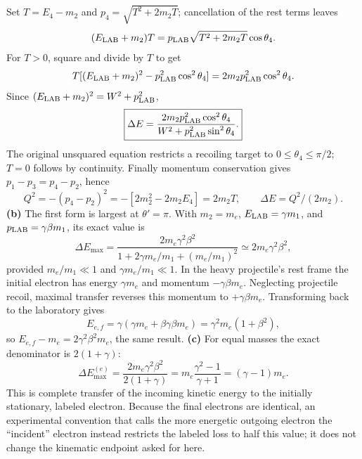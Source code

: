 Set $T=E_4-m_2$ and $p_4=\sqrt{T^2+2m_2T}$; cancellation
of the rest terms leaves
\[
(E_{\rm LAB}+m_2)T=p_{\rm LAB}\sqrt{T^2+2m_2T}\cos\theta_4.
\]
For $T>0$, square and divide by $T$ to get
\[
T[(E_{\rm LAB}+m_2)^2-p_{\rm LAB}^2\cos^2\theta_4]
=2m_2p_{\rm LAB}^2\cos^2\theta_4.
\]
Since $(E_{\rm LAB}+m_2)^2=W^2+p_{\rm LAB}^2$,
\[
\boxed{\Delta E=\frac{2m_2p_{\rm LAB}^2\cos^2\theta_4}
{W^2+p_{\rm LAB}^2\sin^2\theta_4}.}
\]
The original unsquared equation restricts a recoiling target to
$0\leq\theta_4\leq\pi/2$; $T=0$ follows by continuity.
Finally momentum conservation gives $p_1-p_3=p_4-p_2$, hence
\[
Q^2=-(p_4-p_2)^2=-[2m_2^2-2m_2E_4]=2m_2T,
\qquad\boxed{\Delta E=Q^2/(2m_2).}
\]
\textbf{(b)} The first form is largest at $\theta'=\pi$.
With $m_2=m_e$, $E_{\rm LAB}=\gamma m_1$, and
$p_{\rm LAB}=\gamma\beta m_1$, its exact value is
\[
\Delta E_{\max}=\frac{2m_e\gamma^2\beta^2}
{1+2\gamma m_e/m_1+(m_e/m_1)^2}
\simeq\boxed{2m_e\gamma^2\beta^2},
\]
provided $m_e/m_1\ll1$ and $\gamma m_e/m_1\ll1$.
In the heavy projectile's rest frame the initial electron has
energy $\gamma m_e$ and momentum $-\gamma\beta m_e$.
Neglecting projectile recoil, maximal transfer reverses this
momentum to $+\gamma\beta m_e$. Transforming back to the
laboratory gives
\[
E_{e,f}=\gamma(\gamma m_e+\beta\gamma\beta m_e)
=\gamma^2m_e(1+\beta^2),
\]
so $E_{e,f}-m_e=2\gamma^2\beta^2m_e$, the same result.
\textbf{(c)} For equal masses the exact denominator is $2(1+\gamma)$:
\[
\boxed{\Delta E_{\max}^{(e)}=
\frac{2m_e\gamma^2\beta^2}{2(1+\gamma)}
=m_e\frac{\gamma^2-1}{\gamma+1}=(\gamma-1)m_e.}
\]
This is complete transfer of the incoming kinetic energy to the
initially stationary, labeled electron. Because the final electrons
are identical, an experimental convention that calls the more
energetic outgoing electron the ``incident'' electron instead
restricts the labeled loss to half this value; it does not change
the kinematic endpoint asked for here.

